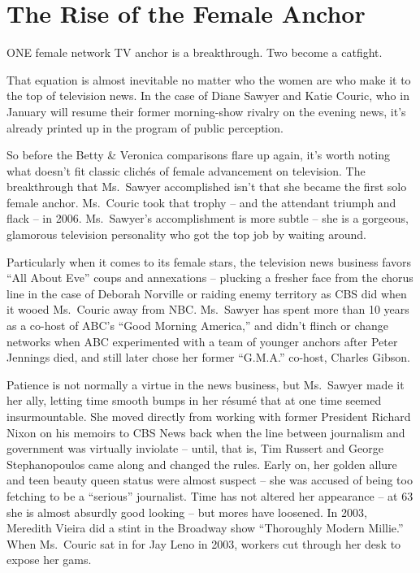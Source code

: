 ﻿\documentclass[12pt]{article}
\begin{document}
\section{The Rise of the Female Anchor}

\lettrine{O}{NE} female network TV anchor is a breakthrough. Two become a catfight.

That equation is almost inevitable no matter who the women are who make it to the top of television
news. In the case of Diane Sawyer and Katie Couric, who in January will resume their former
morning-show rivalry on the evening news, it's already printed up in the program of public
perception.

So before the Betty \& Veronica comparisons flare up again, it's worth noting what doesn't fit
classic clich\'es of female advancement on television. The breakthrough that Ms.~Sawyer accomplished
isn't that she became the first solo female anchor. Ms.~Couric took that trophy -- and the attendant
triumph and flack -- in 2006. Ms.~Sawyer's accomplishment is more subtle -- she is a gorgeous,
glamorous television personality who got the top job by waiting around.

Particularly when it comes to its female stars, the television news business favors ``All About
Eve'' coups and annexations -- plucking a fresher face from the chorus line in the case of Deborah
Norville or raiding enemy territory as CBS did when it wooed Ms.~Couric away from NBC. Ms.~Sawyer
has spent more than 10 years as a co-host of ABC's ``Good Morning America,'' and didn't flinch or
change networks when ABC experimented with a team of younger anchors after Peter Jennings died, and
still later chose her former ``G.M.A.'' co-host, Charles Gibson.

Patience is not normally a virtue in the news business, but Ms.~Sawyer made it her ally, letting
time smooth bumps in her r\'esum\'e that at one time seemed insurmountable. She moved directly from
working with former President Richard Nixon on his memoirs to CBS News back when the line between
journalism and government was virtually inviolate -- until, that is, Tim Russert and George
Stephanopoulos came along and changed the rules. Early on, her golden allure and teen beauty queen
status were almost suspect -- she was accused of being too fetching to be a ``serious'' journalist.
Time has not altered her appearance -- at 63 she is almost absurdly good looking -- but mores have
loosened. In 2003, Meredith Vieira did a stint in the Broadway show ``Thoroughly Modern Millie.''
When Ms.~Couric sat in for Jay Leno in 2003, workers cut through her desk to expose her gams.
\end{document}
